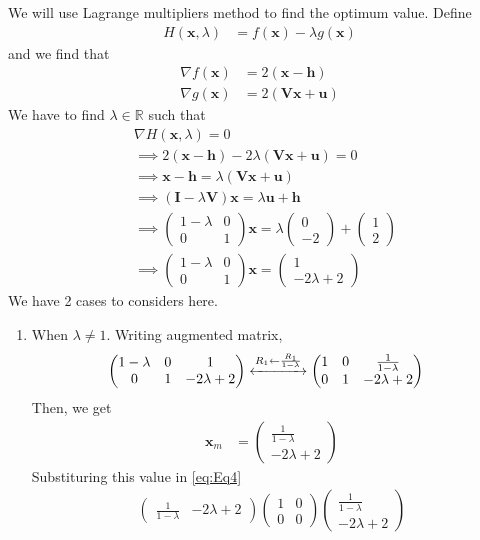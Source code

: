 \documentclass[12pt]{article}
\providecommand{\brak}[1]{\ensuremath{\left(#1\right)}}
\newcommand{\myvec}[1]{\ensuremath{\begin{pmatrix}#1\end{pmatrix}}}
\let\vec\mathbf
\begin{document}
\begin{enumerate}
We will use Lagrange multipliers method to find the optimum value. Define
\begin{align}
	H\brak{\vec{x}, \lambda} &= f\brak{\vec{x}} - \lambda g\brak{\vec{x}} 
\end{align}
and we find that 
\begin{align}
	\nabla f\brak{\vec{x}} &= 2\brak{\vec{x}-\vec{h}} \\
	\nabla g\brak{\vec{x}} &= 2\brak{\vec{V}\vec{x}+\vec{u}}
\end{align}
We have to find $\lambda \in \mathbb{R}$ such that
\begin{align}
	&\nabla H\brak{\vec{x},\lambda} = 0 \\
        \label{eq:Eqlambda}
	&\implies 2\brak{\vec{x}-\vec{h}} - 2\lambda\brak{\vec{V}\vec{x}+\vec{u}} = 0 \\
        \label{eq:Eqx}
	&\implies \vec{x} - \vec{h} =  \lambda\brak{\vec{V}\vec{x}+\vec{u}}   \\
	&\implies \brak{\vec{I} - \lambda\vec{V}}\vec{x} =  \lambda\vec{u}+\vec{h} \\ 
	&\implies \myvec{1-\lambda & 0 \\ 0 & 1}\vec{x} = \lambda\myvec{0 \\ -2} + \myvec{1 \\2} \\ 
        \label{eq:EqL}
	&\implies \myvec{1-\lambda & 0 \\ 0 & 1}\vec{x} = \myvec{1 \\ -2\lambda+2}  
\end{align}
We have 2 cases to considers here.
\begin{enumerate}
\item When $\lambda \ne 1$. Writing augmented matrix,
\begin{align}
	&\myvec{1-\lambda & 0 & 1\\ 0 & 1 & -2\lambda+2} \xleftrightarrow[]{R_1 \leftarrow \frac{R_1}{1-\lambda}} \myvec{1&0&\frac{1}{1-\lambda}\\0&1&-2\lambda+2}
\end{align}
Then, we get
\begin{align}
        \label{eq:Eqxm}
	\vec{x}_{m} &= \myvec{ \frac{1}{1-\lambda} \\ -2\lambda+2}
\end{align}
Substituring this value in \eqref{eq:Eq4}
\begin{multline}
	\myvec{\frac{1}{1-\lambda} & -2\lambda+2}\myvec{1 & 0 \\ 0 & 0}\myvec{\frac{1}{1-\lambda} \\ -2\lambda+2} \\ 

\end{multline}
\end{enumerate}
\end{enumerate}
\end{document}
